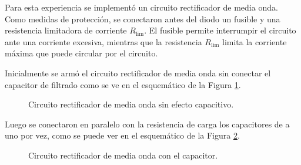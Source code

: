 Para esta experiencia se implementó un circuito rectificador de media onda. Como medidas de protección, se conectaron antes del diodo un fusible y una resistencia limitadora de corriente $R_{\lim}$. El fusible permite interrumpir el circuito ante una corriente excesiva, mientras que la resistencia $R_{\lim}$ limita la corriente máxima que puede circular por el circuito.

Inicialmente se armó el circuito rectificador de media onda sin conectar el capacitor de filtrado como se ve en el esquemático de la Figura \ref{fig:rectificador_media_onda}.

\begin{figure}[H]
    \centering
    \caption{Circuito rectificador de media onda sin efecto capacitivo.}
    \label{fig:rectificador_media_onda}
\end{figure}

Luego se conectaron en paralelo con la resistencia de carga los capacitores de a uno por vez, como se puede ver en el esquemático de la Figura \ref{fig:rectificador_media_onda_cap}.

\begin{figure}[H]
    \centering
    \caption{Circuito rectificador de media onda con el capacitor.}
    \label{fig:rectificador_media_onda_cap}
\end{figure}

